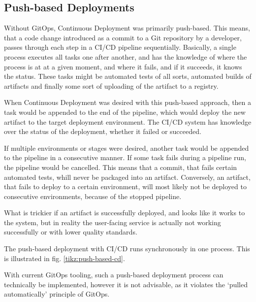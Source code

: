 \subsection*{Push-based Deployments}

Without GitOps, Continuous Deployment was primarily push-based.
This means, that a code change introduced as a commit to a Git repository by a developer,
passes through each step in a CI/CD pipeline sequentially.
Basically, a single process executes all tasks one after another,
and has the knowledge of where the process is at at a given moment,
and where it fails, and if it succeeds, it knows the status.
These tasks might be automated tests of all sorts,
automated builds of artifacts and finally some sort of uploading of the artifact to a registry.

When Continuous Deployment was desired with this push-based approach,
then a task would be appended to the end of the pipeline,
which would deploy the new artifact to the target deployment environment.
The CI/CD system has knowledge over the status of the deployment, whether it failed or succeeded.

If multiple environments or stages were desired,
another task would be appended to the pipeline
in a consecutive manner.
If some task fails during a pipeline run,
the pipeline would be cancelled.
This means that a commit, that fails certain automated tests,
whill never be packaged into an artifact.
Conversely, an artifact, that fails to deploy to a certain environment,
will most likely not be deployed to consecutive environments, because of the stopped pipeline.

What is trickier if an artifact is successfully deployed,
and looks like it works to the system,
but in reality the user-facing service is actually not working successfully or with lower quality standards.

The push-based deployment with CI/CD runs synchronously in one process.
This is illustrated in fig. \ref{tikz:push-based-cd}.

With current GitOps tooling,
such a push-based deployment process can technically be implemented,
however it is not advisable, as it violates the \enquote*{pulled automatically} principle of GitOps.



